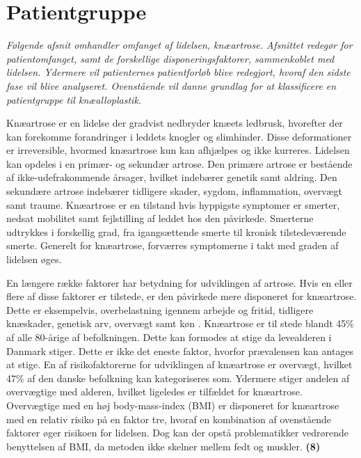 \section{Patientgruppe}
\textit{Følgende afsnit omhandler omfanget af lidelsen, knæartrose. Afsnittet redegør for patientomfanget, samt de forskellige disponeringsfaktorer, sammenkoblet med lidelsen. Ydermere vil patienternes patientforløb blive redegjort, hvoraf den sidste fase vil blive analyseret. Ovenstående vil danne grundlag for at klassificere en patientgruppe til knæalloplastik.}

Knæartrose er en lidelse der gradvist nedbryder knæets ledbrusk, hvorefter der kan forekomme forandringer i leddets knogler og slimhinder. Disse deformationer er irreversible, hvormed knæartrose kun kan afhjælpes og ikke kurreres. Lidelsen kan opdeles i en primær- og sekundær artrose. Den primære artrose er bestående af ikke-udefrakommende årsager, hvilket indebærer genetik samt aldring. Den sekundære artrose indebærer tidligere skader, sygdom, inflammation, overvægt samt traume. Knæartrose er en tilstand hvis hyppigste symptomer er smerter, nedsat mobilitet samt fejlstilling af leddet hos den påvirkede. Smerterne udtrykkes i forskellig grad, fra igangsættende smerte til kronisk tilstedeværende smerte. Generelt for knæartrose, forværres symptomerne i takt med graden af lidelsen øges. \citep{Lind2016b}

En længere række faktorer har betydning for udviklingen af artrose. Hvis en eller flere af disse faktorer er tilstede, er den påvirkede mere disponeret for knæartrose. Dette er eksempelvis, overbelastning igennem arbejde og fritid, tidligere knæskader, genetisk arv, overvægt samt køn \citep{brostrom2012}. Knæartrose er til stede blandt 45\% af alle 80-årige af befolkningen. Dette kan formodes at stige da levealderen i Danmark stiger. Dette er ikke det eneste faktor, hvorfor prævalensen kan antages at stige. En af risikofaktorerne for udviklingen af knæartrose er overvægt, hvilket 47\% af den danske befolkning kan kategoriseres som. Ydermere stiger andelen af overvægtige med alderen, hvilket ligeledes er tilfældet for knæartrose. Overvægtige med en høj body-mass-index (BMI) er disponeret for knæartrose med en relativ risiko på en faktor tre, hvoraf en kombination af ovenstående faktorer øger risikoen for lidelsen. Dog kan der opstå problematikker vedrørende benyttelsen af BMI, da metoden ikke skelner mellem fedt og muskler. \textbf{(8)} \citep{brostrom2012} \citep{Vestergaard2014} \citep{Vestergaard2016} \citep{Lind2016} \citep{Lind2016b}

